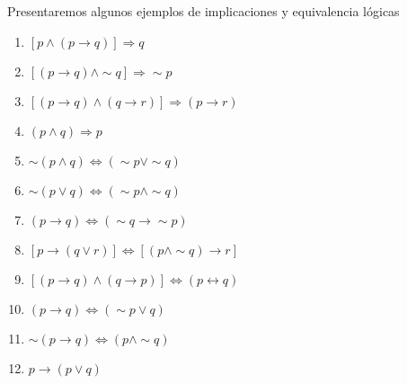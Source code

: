 \begin{ejemplo}{Presentaremos algunos ejemplos de implicaciones y equivalencia
lógicas\label{ej2_11} } 
\begin{enumerate}
\item $\left[  p\wedge\left(  p\rightarrow q\right)  \right]  \Longrightarrow
q$

\item $\left[  \left(  p\rightarrow q\right)  \wedge\sim q\right]
\Longrightarrow\sim p$

\item $\left[  \left(  p\rightarrow q\right)  \wedge\left(  q\rightarrow
r\right)  \right]  \Longrightarrow\left(  p\rightarrow r\right)  $

\item $\left(  p\wedge q\right)  \Longrightarrow p$
\item $\sim\left(  p\wedge q\right)  \Longleftrightarrow\left(  \sim p\vee\sim
q\right)  $

\item $\sim\left(  p\vee q\right)  \Longleftrightarrow\left(  \sim p\wedge\sim
q\right)  $

\item $\left(  p\rightarrow q\right)  \Longleftrightarrow\left(  \sim
q\rightarrow\sim p\right)  $

\item $\left[  p\rightarrow\left(  q\vee r\right)  \right]
\Longleftrightarrow\left[  \left(  p\wedge\sim q\right)  \rightarrow r\right]
$

\item $\left[  \left(  p\rightarrow q\right)  \wedge\left(  q\rightarrow
p\right)  \right]  \Longleftrightarrow\left(  p\leftrightarrow q\right)  $

\item $\left(  p\rightarrow q\right)  \Longleftrightarrow\left(  \sim p\vee
q\right)  $

\item $\sim\left(  p\rightarrow q\right)  \Longleftrightarrow\left(
p\wedge\sim q\right)  $
\item $p \rightarrow \left( p \vee q\right)$
\end{enumerate}
\end{ejemplo} 
